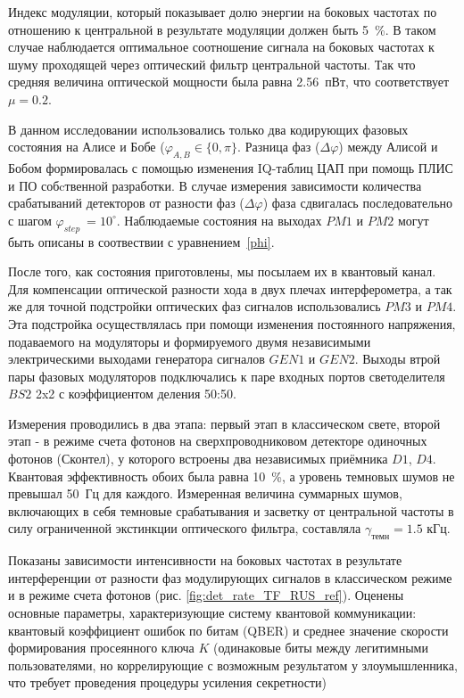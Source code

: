 Индекс модуляции, который показывает долю энергии на боковых частотах по отношению к центральной в результате модуляции должен быть 5~\%. В таком случае наблюдается оптимальное соотношение сигнала на боковых частотах к шуму проходящей через оптический фильтр центральной частоты.  Так что средняя величина оптической мощности была равна 2.56~пВт, что соответствует $\mu=0.2$.  


В данном исследовании  использовались только два кодирующих фазовых состояния на Алисе и Бобе ($\varphi_{A,B}\in\{0,\pi\}$. Разница фаз ($\Delta\varphi$) между Алисой и Бобом формировалась с помощью изменения IQ-таблиц ЦАП при помощь ПЛИС и ПО собcтвенной разработки. В случае измерения зависимости количества срабатываний детекторов от разности фаз ($\Delta\varphi$) фаза сдвигалась последовательно с шагом $\varphi_{step}\ = 10^{\circ}$. Наблюдаемые состояния на выходах $PM1$ и $PM2$ могут быть описаны в соотвествии с уравнением~\ref{phi}.

После того, как состояния приготовлены, мы посылаем их в квантовый канал. Для компенсации оптической разности хода в двух плечах интерферометра, а так же для точной подстройки оптических фаз сигналов использовались $PM3$ и $PM4$. Эта подстройка осуществлялась при помощи изменения постоянного напряжения, подаваемого на модуляторы и формируемого двумя независимыми электрическими выходами генератора сигналов $GEN1$ и $GEN2$. Выходы втрой пары фазовых модуляторов подключались к паре входных портов светоделителя $BS2$ 2x2 с коэффициентом деления 50:50.

Измерения проводились в два этапа: первый этап в классическом свете, второй этап - в режиме счета фотонов на сверхпроводниковом детекторе одиночных фотонов (Сконтел), у которого встроены два независимых приёмника $D1$, $D4$. Квантовая эффективность обоих была равна 10~\%, а уровень темновых шумов не превышал 50~Гц для каждого. Измеренная величина суммарных шумов, включающих в себя темновые срабатывания и засветку от центральной частоты в силу ограниченной экстинкции оптического фильтра, составляла $\gamma_{темн}=1.5$ кГц.

Показаны зависимости интенсивности на боковых частотах в результате интерференции от разности фаз модулирующих сигналов в классическом режиме и в режиме счета фотонов (рис. \ref{fig:det_rate_TF_RUS_ref}). Оценены основные параметры, характеризующие систему квантовой коммуникации: квантовый коэффициент ошибок по битам (QBER) и среднее значение скорости формирования просеянного ключа $K$ (одинаковые биты между легитимными пользователями, но коррелирующие с возможным результатом у злоумышленника, что требует проведения процедуры усиления секретности) 



